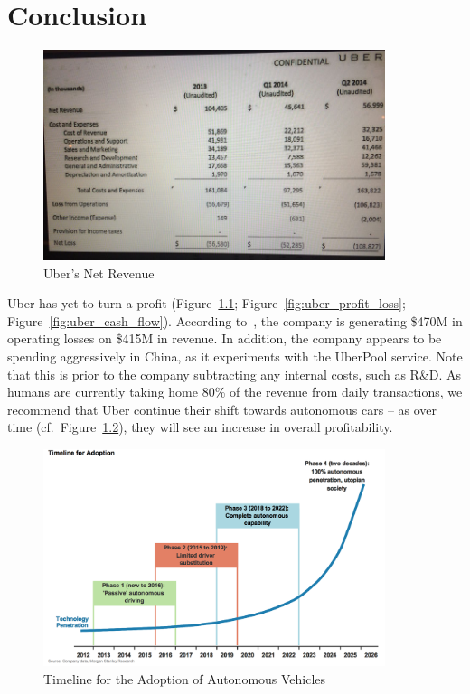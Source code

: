 \chapter{Conclusion}\label{chap:conclusion}

  \begin{figure}
    \centering
    \begin{minipage}{10cm}
      \centering
      \includegraphics[width=10cm]{inc/uber_net_revenue.png}
      \caption[Uber's Net Revenue]{Uber's Net Revenue~\parencite{uber2015}}
      \label{fig:uber_net_revenue}
    \end{minipage}
  \end{figure}

  Uber has yet to turn a profit (Figure~\ref{fig:uber_net_revenue}; Figure~\ref{fig:uber_profit_loss}; Figure~\ref{fig:uber_cash_flow}). According to~\cite{newcomer2015}, the company is generating \$470M in operating losses on \$415M in revenue. In addition, the company appears to be spending aggressively in China, as it experiments with the UberPool service. Note that this is prior to the company subtracting any internal costs, such as R\&D. As humans are currently taking home 80\% of the revenue from daily transactions, we recommend that Uber continue their shift towards autonomous cars -- as over time (cf.\ Figure~\ref{fig:autonomous_vehicles}), they will see an increase in overall profitability.

  \begin{figure}
    \centering
    \begin{minipage}{10cm}
      \centering
      \includegraphics[width=10cm]{inc/autonomous_vehicles.png}
      \caption[Timeline for the Adoption of Autonomous Vehicles]{Timeline for the Adoption of Autonomous Vehicles~\parencite{owyang2015}}
      \label{fig:autonomous_vehicles}
    \end{minipage}
  \end{figure}
